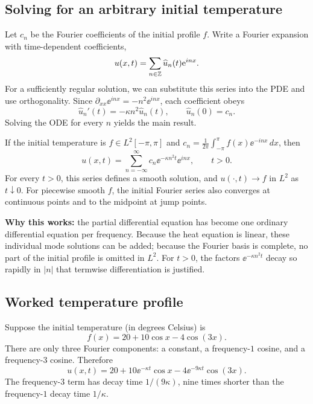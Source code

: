 \subsection{Solving for an arbitrary initial temperature}
Let $c_n$ be the Fourier coefficients of the initial profile $f$. Write a
Fourier expansion with time-dependent coefficients,
\[
 u(x,t)=\sum_{n\in\mathbb{Z}}\widehat{u}_n(t)\mathrm{e}^{inx}.
\]
For a sufficiently regular solution, we can substitute this series into the
PDE and use orthogonality. Since $\partial_{xx}\ee^{inx}=-n^2\ee^{inx}$,
each coefficient obeys
\[
 \widehat{u}_n'(t)=-\kappa n^2\widehat{u}_n(t),
 \qquad \widehat{u}_n(0)=c_n.
\]
Solving the ODE for every $n$ yields the main result.

\begin{theorem}\label{thm:heat}
If the initial temperature is $f\in L^2[-\pi,\pi]$ and
$c_n=\frac1{2\pi}\int_{-\pi}^{\pi}f(x)\ee^{-inx}\,dx$, then
\begin{equation}\label{eq:heat-solution}
 \boxed{u(x,t)=\sum_{n=-\infty}^{\infty}
 c_n\ee^{-\kappa n^2t}\ee^{inx},\qquad t>0.}
\end{equation}
For every $t>0$, this series defines a smooth solution, and
$u(\cdot,t)\to f$ in $L^2$ as $t\downarrow0$.
For piecewise smooth $f$, the initial Fourier series also converges at
continuous points and to the midpoint at jump points.
\end{theorem}

\textbf{Why this works:} the partial differential equation has become one
ordinary differential equation per frequency. Because the heat equation is
linear, these individual mode solutions can be added; because the Fourier
basis is complete, no part of the initial profile is omitted in $L^2$.
For $t>0$, the factors $\ee^{-\kappa n^2t}$ decay so rapidly in $|n|$ that
termwise differentiation is justified.

\subsection{Worked temperature profile}
\begin{example}
Suppose the initial temperature (in degrees Celsius) is
\begin{equation}\label{eq:initial-temp}
 f(x)=20+10\cos x-4\cos(3x).
\end{equation}
There are only three Fourier components: a constant, a frequency-$1$ cosine,
and a frequency-$3$ cosine. Therefore
\begin{equation}\label{eq:worked-heat}
 \boxed{u(x,t)=20+10\ee^{-\kappa t}\cos x
 -4\ee^{-9\kappa t}\cos(3x).}
\end{equation}
The frequency-$3$ term has decay time $1/(9\kappa)$, nine times shorter
than the frequency-$1$ decay time $1/\kappa$.
\end{example}

